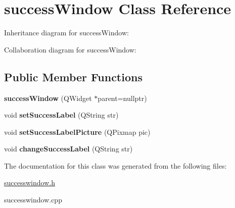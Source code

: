 \hypertarget{classsuccessWindow}{}\section{success\+Window Class Reference}
\label{classsuccessWindow}


Inheritance diagram for success\+Window\+:


Collaboration diagram for success\+Window\+:
\subsection*{Public Member Functions}
\begin{DoxyCompactItemize}
\item 
\mbox{\label{classsuccessWindow_ad4672f8ec7ecd630c8aba46ca55a34b3}} 
{\bfseries success\+Window} (Q\+Widget $\ast$parent=nullptr)
\item 
\mbox{\label{classsuccessWindow_addecc14e50a6b1cfb5644d06e5c9e68f}} 
void {\bfseries set\+Success\+Label} (Q\+String str)
\item 
\mbox{\label{classsuccessWindow_a8da995c9cc307b6189f266e64475ccca}} 
void {\bfseries set\+Success\+Label\+Picture} (Q\+Pixmap pic)
\item 
\mbox{\label{classsuccessWindow_a15732d474192ddd0e52ed32f22ed65a3}} 
void {\bfseries change\+Success\+Label} (Q\+String str)
\end{DoxyCompactItemize}


The documentation for this class was generated from the following files\+:\begin{DoxyCompactItemize}
\item 
\hyperlink{successwindow_8h}{successwindow.\+h}\item 
successwindow.\+cpp\end{DoxyCompactItemize}
